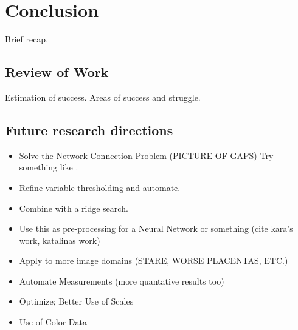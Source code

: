 
\chapter{Conclusion} \label{ch:conclusion}

Brief recap.

\section{Review of Work}

Estimation of success. Areas of success and struggle.

\section{Future research directions} \label{sec:future-research-directions}

\begin{itemize}
	\item Solve the Network Connection Problem (PICTURE OF GAPS)
	Try something like \cite{laptev2000automatic}.
	\item Refine variable thresholding and automate.
	\item Combine with a ridge search.
	\item Use this as pre-processing for a Neural Network or something
	(cite kara's work, katalinas work)
	\item Apply to more image domains (STARE, WORSE PLACENTAS, ETC.)
	\item Automate Measurements (more quantative results too)
	\item Optimize; Better Use of Scales
	\item Use of Color Data
\end{itemize}

